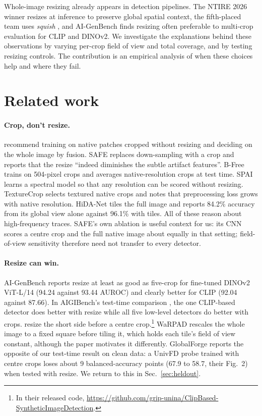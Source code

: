 \documentclass[letterpaper]{article} %
\begin{document}
Whole-image resizing already appears in detection pipelines. The NTIRE
2026 winner resizes at inference to preserve global spatial context, the
fifth-placed team uses \emph{squish} \cite{gushchin2026ntire}, and AI-GenBench
\cite{pellegrini2025aigenbench} finds resizing often preferable to multi-crop
evaluation for CLIP and DINOv2. We investigate the explanations behind these
observations by varying per-crop field of view and total coverage, and by
testing resizing controls. The contribution is an empirical analysis of
when these choices help and where they fail.

\section{Related work}
\label{sec:related}

\paragraph{Crop, don't resize.} \citet{corvi2023detection} recommend
training on native patches cropped without resizing and deciding on the whole
image by fusion. SAFE \cite{li2025safe} replaces
down-sampling with a crop and reports that the resize ``indeed diminishes the
subtle artifact features''. B-Free \cite{guillaro2025bfree} trains on
504-pixel crops and averages native-resolution crops at test time.
SPAI \cite{karageorgiou2025spai} learns a spectral model so that any
resolution can be scored without resizing. TextureCrop \cite{konstantinidou2025texturecrop}
selects textured native crops and notes that preprocessing loss grows with
native resolution. HiDA-Net \cite{mu2026hidanet} tiles the full image and
reports 84.2\% accuracy from its global view alone against 96.1\% with tiles.
All of these reason about high-frequency traces. SAFE's own ablation is
useful context for us: its CNN scores a centre crop and the full native image
about equally in that setting; field-of-view sensitivity therefore need
not transfer to every detector.

\paragraph{Resize can win.} AI-GenBench \cite{pellegrini2025aigenbench}
reports resize at least as good as five-crop for fine-tuned DINOv2 ViT-L/14
(94.24 against 93.44 AUROC) and clearly better for CLIP (92.04 against 87.66).
In AIGIBench's test-time comparison \cite{li2025aigibench}, the one CLIP-based
detector does better with resize while all five low-level detectors do better
with crops. \citet{cozzolino2024raising} resize the short side
before a centre crop.\footnote{In their released code,
\url{https://github.com/grip-unina/ClipBased-SyntheticImageDetection}.} WaRPAD \cite{choi2025warpad} rescales the whole image to
a fixed square before tiling it, which holds each tile's field of view
constant, although the paper motivates it differently. GlobalForge \cite{cui2026globalforge}
reports the opposite of our test-time result on clean data: a UnivFD probe
trained with centre crops loses about 9 balanced-accuracy points (67.9 to
58.7, their Fig.~2) when tested with resize. We return to this in Sec.~\ref{sec:heldout}.
\end{document}
